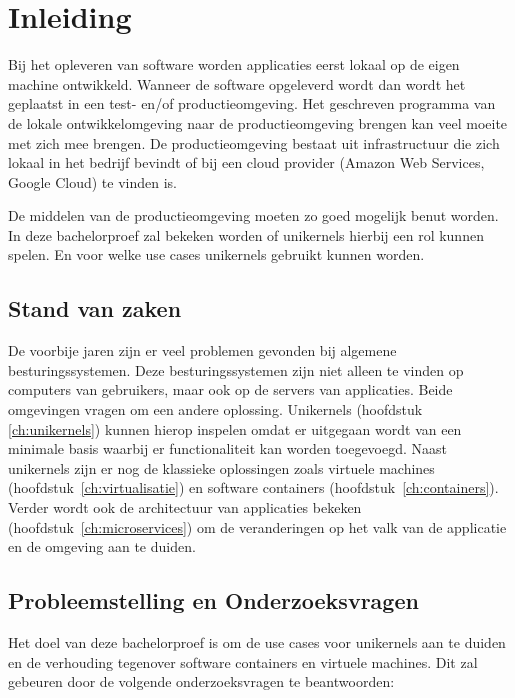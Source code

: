 
\chapter{Inleiding}
\label{ch:inleiding}

Bij het opleveren van software worden applicaties eerst lokaal op de eigen machine ontwikkeld. Wanneer de software opgeleverd wordt dan wordt het geplaatst in een test- en/of productieomgeving. Het geschreven programma van de lokale ontwikkelomgeving naar de productieomgeving brengen kan veel moeite met zich mee brengen. De productieomgeving bestaat uit infrastructuur die zich lokaal in het bedrijf bevindt of bij een cloud provider (Amazon Web Services, Google Cloud) te vinden is.

De middelen van de productieomgeving moeten zo goed mogelijk benut worden. In deze bachelorproef zal bekeken worden of unikernels hierbij een rol kunnen spelen. En voor welke use cases unikernels gebruikt kunnen worden.

\section{Stand van zaken}
\label{sec:stand-van-zaken}

De voorbije jaren zijn er veel problemen gevonden bij algemene besturingssystemen. Deze besturingssystemen zijn niet alleen te vinden op computers van gebruikers, maar ook op de servers van applicaties. Beide omgevingen vragen om een andere oplossing. Unikernels (hoofdstuk \ref{ch:unikernels}) kunnen hierop inspelen omdat er uitgegaan wordt van een minimale basis waarbij er functionaliteit kan worden toegevoegd. Naast unikernels zijn er nog de klassieke oplossingen zoals virtuele machines (hoofdstuk~\ref{ch:virtualisatie}) en software containers (hoofdstuk~\ref{ch:containers}). Verder wordt ook de architectuur van applicaties bekeken (hoofdstuk~\ref{ch:microservices}) om de veranderingen op het valk van de applicatie en de omgeving aan te duiden.

\section{Probleemstelling en Onderzoeksvragen}
\label{sec:onderzoeksvragen}

Het doel van deze bachelorproef is om de use cases voor unikernels aan te duiden en de verhouding tegenover software containers en virtuele machines. 
Dit zal gebeuren door de volgende onderzoeksvragen te beantwoorden:

